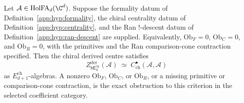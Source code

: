\begin{thm}\label{app:thm:relative-Ed-deligne}
Let \(\mathcal A\in\mathrm{HolFA}_d(\C^d)\).  Suppose the formality
datum of Definition~\ref{app:hyp:formality}, the chiral centrality datum
of Definition~\ref{app:hyp:centrality}, and the Ran \( ! \)-descent
datum of Definition~\ref{app:hyp:ran-descent} are supplied.  Equivalently,
\(\mathrm{Ob}_{F}=0\), \(\mathrm{Ob}_{C}=0\), and
\(\mathrm{Ob}_{R}=0\), with the primitives and the Ran comparison-cone
contraction specified.  Then the chiral derived centre satisfies
\[
  Z^{\mathrm{der}}_{\mathsf{hE}_d^{\mathrm{ch}}}(\mathcal A)
   \;\simeq\;
   C^\bullet_{\mathrm{ch}}(\mathcal A,\mathcal A)
\]
as \(E_{d+1}^{\mathrm{ch}}\)-algebras.  A nonzero
\(\mathrm{Ob}_{F}\), \(\mathrm{Ob}_{C}\), or \(\mathrm{Ob}_{R}\), or a
missing primitive or comparison-cone contraction, is the exact
obstruction to this criterion in the selected coefficient category.
\end{thm}

